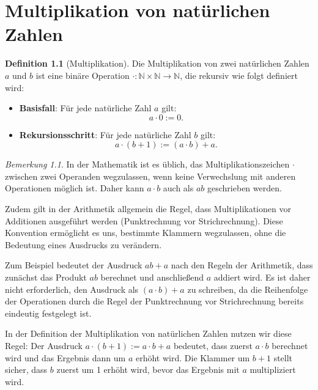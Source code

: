 \documentclass{book}
\theoremstyle{plain}
\theoremstyle{remark}
\newtheorem*{remark}{Bemerkung}
\theoremstyle{definition}
\newtheorem{definition}{Definition}[section]
\begin{document}
\chapter{Multiplikation von natürlichen Zahlen}

\begin{definition}[Multiplikation]
    Die Multiplikation von zwei natürlichen Zahlen \( a \) und \( b \) ist eine binäre Operation \( \cdot: \mathbb{N} \times \mathbb{N} \to \mathbb{N} \), die rekursiv wie folgt definiert wird:
    
    \begin{itemize}
        \item \textbf{Basisfall}: Für jede natürliche Zahl \( a \) gilt:
        \[
        a \cdot 0 := 0.
        \]
        
        \item \textbf{Rekursionsschritt}: Für jede natürliche Zahl \( b \) gilt:
        \[
        a \cdot (b+1) := (a \cdot b) + a.
        \]
    \end{itemize}
\end{definition}
\begin{remark}
In der Mathematik ist es üblich, das Multiplikationszeichen \(\cdot\) zwischen zwei Operanden wegzulassen, wenn keine Verwechslung mit anderen Operationen möglich ist. Daher kann \( a \cdot b \) auch als \( ab \) geschrieben werden.

Zudem gilt in der Arithmetik allgemein die Regel, dass Multiplikationen vor Additionen ausgeführt werden (Punktrechnung vor Strichrechnung). Diese Konvention ermöglicht es uns, bestimmte Klammern wegzulassen, ohne die Bedeutung eines Ausdrucks zu verändern.

Zum Beispiel bedeutet der Ausdruck \( ab + a \) nach den Regeln der Arithmetik, dass zunächst das Produkt \( ab \) berechnet und anschließend \( a \) addiert wird. Es ist daher nicht erforderlich, den Ausdruck als \( (a \cdot b) + a \) zu schreiben, da die Reihenfolge der Operationen durch die Regel der Punktrechnung vor Strichrechnung bereits eindeutig festgelegt ist.

In der Definition der Multiplikation von natürlichen Zahlen nutzen wir diese Regel: Der Ausdruck \( a \cdot (b+1) := a \cdot b + a \) bedeutet, dass zuerst \( a \cdot b \) berechnet wird und das Ergebnis dann um \( a \) erhöht wird. Die Klammer um \( b+1 \) stellt sicher, dass \( b \) zuerst um 1 erhöht wird, bevor das Ergebnis mit \( a \) multipliziert wird.
\end{remark}
\end{document}
